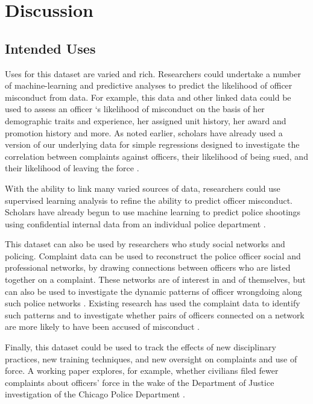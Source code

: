 

\section{Discussion} \label{sec:discussion}

\subsection{Intended Uses}

Uses for this dataset are varied and rich. Researchers could undertake a number
of machine-learning and predictive analyses to predict the likelihood of
officer misconduct from data. For example, this data and other linked data
could be used to assess an officer ‘s likelihood of misconduct on the basis of
her demographic traits and experience, her assigned unit history, her award and
promotion history and more. As noted earlier, scholars have already used a
version of our underlying data for simple regressions designed to investigate
the correlation between complaints against officers, their likelihood of being
sued, and their likelihood of leaving the force \cite{Rozema19}. 

With the ability to link many varied sources of data, researchers could use
supervised learning analysis to refine the ability to predict officer
misconduct. Scholars have already begun to use machine learning to predict
police shootings using confidential internal data from an individual police
department \cite{Helsby18}.

This dataset can also be used by researchers who study social networks and
policing. Complaint data can be used to reconstruct the police officer social
and professional networks, by drawing connections between officers who are
listed together on a complaint. These networks are of interest in and of
themselves, but can also be used to investigate the dynamic patterns of officer
wrongdoing along such police networks \cite{Roithmayr16}. Existing research has used the complaint
data to identify such patterns and to investigate whether pairs of officers
connected on a network are more likely to have been accused of misconduct \cite{Ouellet19}.

Finally, this dataset could be used to track the effects of new disciplinary
practices, new training techniques, and new oversight on complaints and use of
force. A working paper explores, for example, whether civilians filed fewer
complaints about officers’ force in the wake of the Department of Justice
investigation of the Chicago Police Department \cite{Travers20}. 

